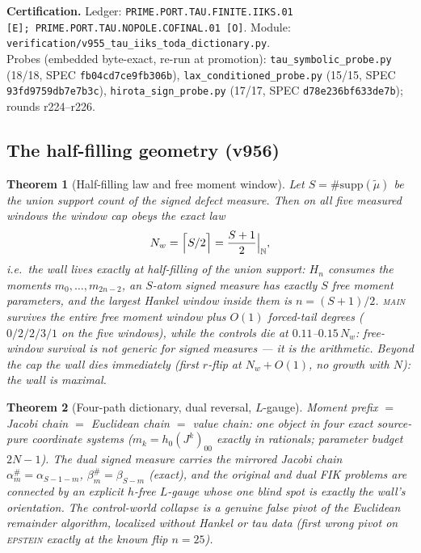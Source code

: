 \documentclass[11pt]{article}
\newcommand{\certbox}[3]{%
  \par\medskip\noindent\colorbox{certgray}{\parbox{\dimexpr\linewidth-2\fboxsep}{%
    \footnotesize\raggedright\textbf{Certification.} Ledger: \texttt{#1}.\quad
    Module: \texttt{#2}.\\ #3}}\par\medskip}
\newtheorem{theorem}{Theorem}[section]
\theoremstyle{definition}
\theoremstyle{remark}
\newcommand{\mut}{\tilde\mu}
\begin{document}
\certbox{PRIME.PORT.TAU.FINITE.IIKS.01 [E];\ PRIME.PORT.TAU.NOPOLE.COFINAL.01 [O]}%
{verification/v955\_tau\_iiks\_toda\_dictionary.py}%
{Probes (embedded byte-exact, re-run at promotion): \texttt{tau\_symbolic\_probe.py}
(18/18, SPEC \texttt{fb04cd7ce9fb306b}), \texttt{lax\_conditioned\_probe.py}
(15/15, SPEC \texttt{93fd9759db7e7b3c}), \texttt{hirota\_sign\_probe.py}
(17/17, SPEC \texttt{d78e236bf633de7b}); rounds r224--r226.}

\subsection{The half-filling geometry (v956)}

\begin{theorem}[Half-filling law and free moment window]\label{thm:v956}
Let $S=\#\mathrm{supp}(\mut)$ be the union support count of the signed
defect measure.  Then on all five measured windows the window cap obeys the
exact law
\[
N_w=\Bigl\lceil S/2\Bigr\rceil=\frac{S+1}{2}\Big|_{\mathbb N},
\]
i.e.\ the wall lives exactly at \emph{half-filling} of the union support:
$H_n$ consumes the moments $m_0,\dots,m_{2n-2}$, an $S$-atom signed measure
has exactly $S$ free moment parameters, and the largest Hankel window
inside them is $n=(S+1)/2$.  \textsc{main} survives the \emph{entire} free
moment window plus $O(1)$ forced-tail degrees ($0/2/2/3/1$ on the five
windows), while the controls die at $0.11$--$0.15\,N_w$: free-window
survival is not generic for signed measures --- it is the arithmetic.
Beyond the cap the wall dies immediately (first $r$-flip at $N_w+O(1)$,
no growth with $N$): \emph{the wall is maximal}.
\end{theorem}

\begin{theorem}[Four-path dictionary, dual reversal, $L$-gauge]\label{thm:v956b}
Moment prefix $=$ Jacobi chain $=$ Euclidean chain $=$ value chain: one
object in four exact source-pure coordinate systems
($m_k=h_0(J^k)_{00}$ exactly in rationals; parameter budget $2N-1$).  The
dual signed measure carries the mirrored Jacobi chain
$\alpha^{\#}_m=\alpha_{S-1-m}$, $\beta^{\#}_m=\beta_{S-m}$ (exact), and the
original and dual FIK problems are connected by an explicit $h$-free
$L$-gauge whose one blind spot is exactly the wall's orientation.  The
control-world collapse is a genuine false pivot of the Euclidean remainder
algorithm, localized without Hankel or tau data (first wrong pivot on
\textsc{epstein} exactly at the known flip $n=25$).
\end{theorem}
\end{document}
